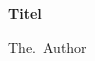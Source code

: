 \documentclass{scrartcl}
\begin{document}
  \begin{titlepage}
    \centering%
    {\Huge\sffamily\bfseries Titel}  %
                                
    \vspace{3cm}                %
    {\large The.~Author}
  \end{titlepage}
\end{document}
